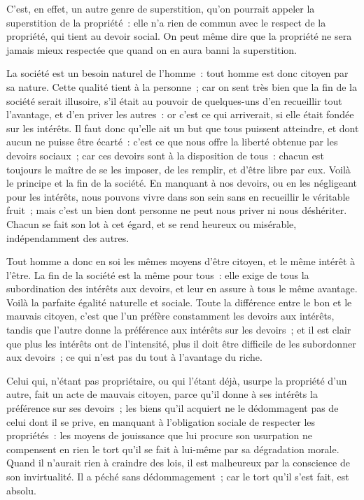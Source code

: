 \documentclass[french,twoside]{book} %
\begin{document}
C’est, en effet, un autre genre de superstition, qu’on pourrait appeler la superstition de la propriété : elle n’a rien de commun avec le respect de la propriété, qui tient au devoir social. On peut même dire que la propriété ne sera jamais mieux respectée que quand on en aura banni la superstition.\par
La société est un besoin naturel de l’homme : tout homme est donc citoyen par sa nature. Cette qualité tient à la personne ; car on sent très bien que la fin de la société serait illusoire, s’il était au pouvoir de quelques-uns d’en recueillir tout l’avantage, et d’en priver les autres : or c’est ce qui arriverait, si elle était fondée sur les intérêts. Il faut donc qu’elle ait un but que tous puissent atteindre, et dont aucun ne puisse être écarté : c’est ce que nous offre la liberté obtenue par les devoirs sociaux ; car ces devoirs sont à la disposition de tous : chacun est toujours le maître de se les imposer, de les remplir, et d’être libre par eux. Voilà le principe et la fin de la société. En manquant à nos devoirs, ou en les négligeant pour les intérêts, nous pouvons vivre dans son sein sans en recueillir le véritable fruit ; mais c’est un bien dont personne ne peut nous priver ni nous déshériter. Chacun se fait son lot à cet égard, et se rend heureux ou misérable, indépendamment des autres.\par
Tout homme a donc en soi les mêmes moyens d’être citoyen, et le même intérêt à l’être. La fin de la société est la même pour tous : elle exige de tous la subordination des intérêts aux devoirs, et leur en assure à tous le même avantage. Voilà la parfaite égalité naturelle et sociale. Toute la différence entre le bon et le mauvais citoyen, c’est que l’un préfère constamment les devoirs aux intérêts, tandis que l’autre donne la préférence aux intérêts sur les devoirs ; et il est clair que plus les intérêts ont de l’intensité, plus il doit être difficile de les subordonner aux devoirs ; ce qui n’est pas du tout à l’avantage du riche.\par
Celui qui, n’étant pas propriétaire, ou qui l’étant déjà, usurpe la propriété d’un autre, fait un acte de mauvais citoyen, parce qu’il donne à ses intérêts la préférence sur ses devoirs ; les biens qu’il acquiert ne le dédommagent pas de celui dont il se prive, en manquant à l’obligation sociale de respecter les propriétés : les moyens de jouissance que lui procure son usurpation ne compensent en rien le tort qu’il se fait à lui-même par sa dégradation morale. Quand il n’aurait rien à craindre des lois, il est malheureux par la conscience de son invirtualité. Il a péché sans dédommagement ; car le tort qu’il s’est fait, est absolu.\par
\end{document}
